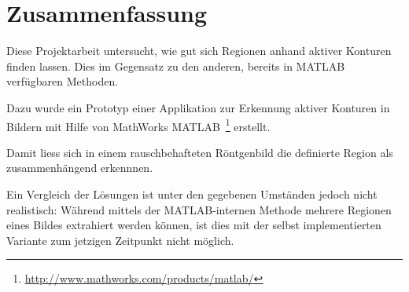 \chapter{Zusammenfassung}
\label{chap:summary}

Diese Projektarbeit untersucht, wie gut sich Regionen anhand aktiver Konturen finden lassen. Dies im Gegensatz zu den anderen, bereits in MATLAB verfügbaren Methoden.

Dazu wurde ein Prototyp einer Applikation zur Erkennung aktiver Konturen in Bildern mit Hilfe von MathWorks \gls{MATLAB}~\footnote{\url{http://www.mathworks.com/products/matlab/}} erstellt.

Damit liess sich in einem rauschbehafteten Röntgenbild die definierte Region als zusammenhängend erkennnen.

Ein Vergleich der Lösungen ist unter den gegebenen Umständen jedoch nicht realistisch: Während mittels der MATLAB-internen Methode mehrere Regionen eines Bildes extrahiert werden können, ist dies mit der selbst implementierten Variante zum jetzigen Zeitpunkt nicht möglich.
